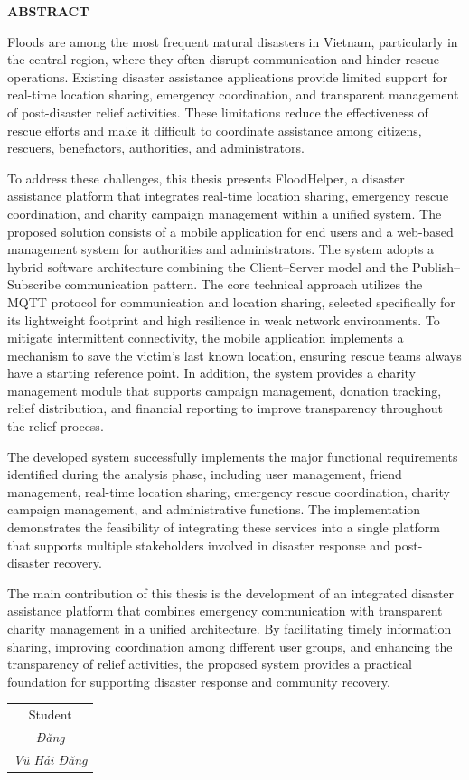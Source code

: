 \documentclass[../DoAn.tex]{subfiles}
\begin{document}
\begin{center}
    \Large{\textbf{ABSTRACT}}\\
\end{center}
\vspace{1cm}

Floods are among the most frequent natural disasters in Vietnam, particularly in the central region, where they often disrupt communication and hinder rescue operations. Existing disaster assistance applications provide limited support for real-time location sharing, emergency coordination, and transparent management of post-disaster relief activities. These limitations reduce the effectiveness of rescue efforts and make it difficult to coordinate assistance among citizens, rescuers, benefactors, authorities, and administrators.

To address these challenges, this thesis presents FloodHelper, a disaster assistance platform that integrates real-time location sharing, emergency rescue coordination, and charity campaign management within a unified system. The proposed solution consists of a mobile application for end users and a web-based management system for authorities and administrators. The system adopts a hybrid software architecture combining the Client–Server model and the Publish–Subscribe communication pattern. The core technical approach utilizes the MQTT protocol for communication and location sharing, selected specifically for its lightweight footprint and high resilience in weak network environments. To mitigate intermittent connectivity, the mobile application implements a mechanism to save the victim’s last known location, ensuring rescue teams always have a starting reference point.  In addition, the system provides a charity management module that supports campaign management, donation tracking, relief distribution, and financial reporting to improve transparency throughout the relief process.

The developed system successfully implements the major functional requirements identified during the analysis phase, including user management, friend management, real-time location sharing, emergency rescue coordination, charity campaign management, and administrative functions. The implementation demonstrates the feasibility of integrating these services into a single platform that supports multiple stakeholders involved in disaster response and post-disaster recovery.

The main contribution of this thesis is the development of an integrated disaster assistance platform that combines emergency communication with transparent charity management in a unified architecture. By facilitating timely information sharing, improving coordination among different user groups, and enhancing the transparency of relief activities, the proposed system provides a practical foundation for supporting disaster response and community recovery.

\begin{flushright}
    \begin{tabular}{@{}c@{}}
        Student \\
        \textit{Đăng} \\
        \textit{Vũ Hải Đăng}
    \end{tabular}
\end{flushright}
\end{document}
